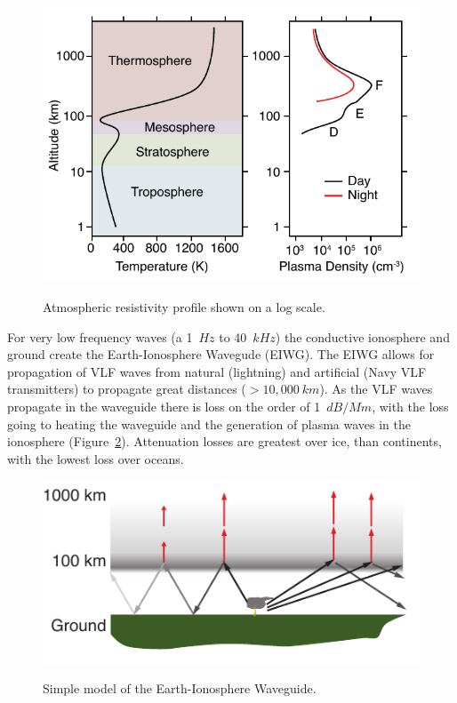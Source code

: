
\begin{figure}[ht!]
	\centering
	\includegraphics[scale=1]{Introduction/Figures/ionosphere.pdf}\\
	\caption{Atmospheric resistivity profile shown on a log scale.}
	\label{intro:fig:ionosphere}
\end{figure}

For very low frequency waves (a 1~$Hz$ to 40~$kHz$) the conductive ionosphere and ground create the Earth-Ionosphere Wavegude (EIWG).
The EIWG allows for propagation of VLF waves from natural (lightning) and artificial (Navy VLF transmitters) to propagate great distances ($>10,000~km$).
As the VLF waves propagate in the waveguide there is loss on the order of 1~$dB/Mm$, with the loss going to heating the waveguide and the generation of plasma waves in the ionosphere (Figure~\ref{intro:fig:eiwg}).
Attenuation losses are greatest over ice, than continents, with the lowest loss over oceans.

\begin{figure}[ht!]
	\centering
	\includegraphics[scale=1]{Introduction/Figures/eiwg.pdf}\\
	\caption{Simple model of the Earth-Ionosphere Waveguide.}
	\label{intro:fig:eiwg}
\end{figure}


